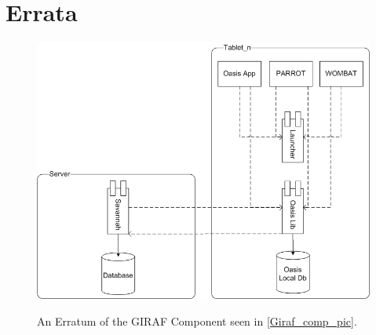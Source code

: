 \chapter{Errata}

\begin{figure}
	\centering
		\includegraphics{input/images/Giraf_comp_pic_fix.png}
	\label{fig:Giraf_comp_pic_fix}
	\caption{An Erratum of the GIRAF Component seen in \autoref{Giraf_comp_pic}.}
\end{figure}
